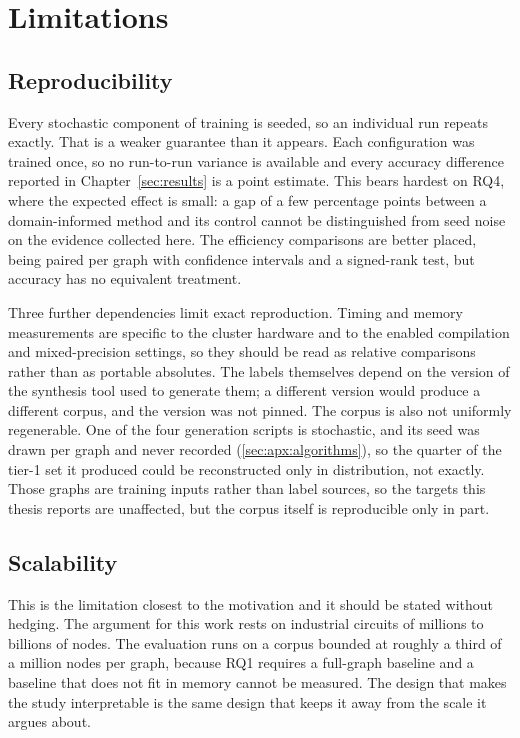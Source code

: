 \section{Limitations}
\label{sec:discussion:limitations}

\subsection{Reproducibility}
\label{sec:discussion:limitations:reproducibility}
Every stochastic component of training is seeded, so an individual run repeats exactly. That
is a weaker guarantee than it appears. Each configuration was trained once, so no run-to-run
variance is available and every accuracy difference reported in Chapter~\ref{sec:results}
is a point estimate. This bears hardest on RQ4, where the expected effect is small: a gap of
a few percentage points between a domain-informed method and its control cannot be
distinguished from seed noise on the evidence collected here. The efficiency comparisons are
better placed, being paired per graph with confidence intervals and a signed-rank test, but
accuracy has no equivalent treatment.

Three further dependencies limit exact reproduction. Timing and memory measurements are
specific to the cluster hardware and to the enabled compilation and mixed-precision
settings, so they should be read as relative comparisons rather than as portable absolutes.
The labels themselves depend on the version of the synthesis tool used to generate them; a
different version would produce a different corpus, and the version was not pinned. The
corpus is also not uniformly regenerable. One of the four generation scripts is stochastic,
and its seed was drawn per graph and never recorded
(\ref{sec:apx:algorithms}), so the quarter of the tier-1 set it produced could be
reconstructed only in distribution, not exactly. Those graphs are training inputs rather
than label sources, so the targets this thesis reports are unaffected, but the corpus itself
is reproducible only in part.

\subsection{Scalability}
\label{sec:discussion:limitations:scalability}
This is the limitation closest to the motivation and it should be stated without hedging.
The argument for this work rests on industrial circuits of millions to billions of nodes.
The evaluation runs on a corpus bounded at roughly a third of a million nodes per graph,
because RQ1 requires a full-graph baseline and a baseline that does not fit in memory cannot
be measured. The design that makes the study interpretable is the same design that keeps it
away from the scale it argues about.

